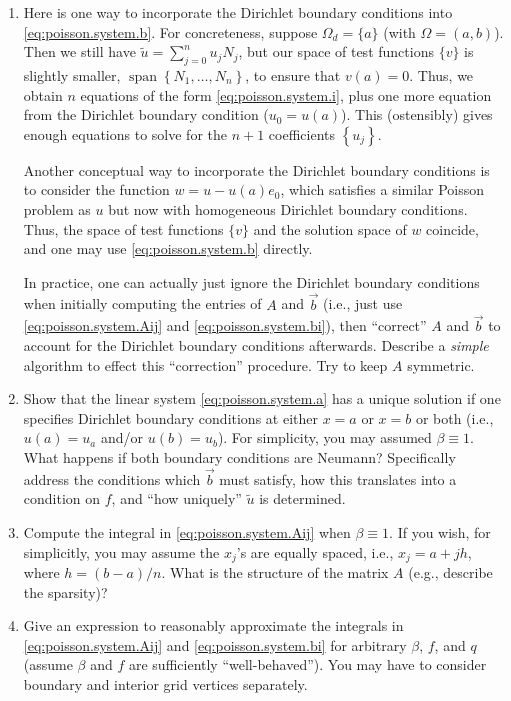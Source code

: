 \begin{enumerate}

\item Here is one way to incorporate the Dirichlet boundary conditions into \eqref{eq:poisson.system.b}. For concreteness, suppose $\Omega_d = \{a\}$ (with $\Omega = (a,b)$). Then we still have $\tilde{u} = \sum_{j = 0}^n u_j N_j$, but our space of test functions $\{v\}$ is slightly smaller, $\operatorname{span} \left\{ N_1, \dotsc, N_n \right\}$, to ensure that $v(a) = 0$. Thus, we obtain $n$ equations of the form \eqref{eq:poisson.system.i}, plus one more equation from the Dirichlet boundary condition ($u_0 = u(a)$). This (ostensibly) gives enough equations to solve for the $n + 1$ coefficients $\left\{ u_j \right\}$.

Another conceptual way to incorporate the Dirichlet boundary conditions is to consider the function $w = u - u(a) e_0$, which satisfies a similar Poisson problem as $u$ but now with homogeneous Dirichlet boundary conditions. Thus, the space of test functions $\{v\}$ and the solution space of $w$ coincide, and one may use \eqref{eq:poisson.system.b} directly.

In practice, one can actually just ignore the Dirichlet boundary conditions when initially computing the entries of $A$ and $\vec{b}$ (i.e., just use \eqref{eq:poisson.system.Aij} and \eqref{eq:poisson.system.bi}), then ``correct'' $A$ and $\vec{b}$ to account for the Dirichlet boundary conditions afterwards. Describe a \emph{simple} algorithm to effect this ``correction'' procedure. Try to keep $A$ symmetric.

\item Show that the linear system \eqref{eq:poisson.system.a} has a unique solution if one specifies Dirichlet boundary conditions at either $x = a$ or $x = b$ or both (i.e., $u(a) = u_a$ and/or $u(b) = u_b$). For simplicity, you may assumed $\beta \equiv 1$. What happens if both boundary conditions are Neumann? Specifically address the conditions which $\vec{b}$ must satisfy, how this translates into a condition on $f$, and ``how uniquely'' $\tilde{u}$ is determined.

\item Compute the integral in \eqref{eq:poisson.system.Aij} when $\beta \equiv 1$. If you wish, for simplicitly, you may assume the $x_j$'s are equally spaced, i.e., $x_j = a + j h$, where $h = (b - a)/n$. What is the structure of the matrix $A$ (e.g., describe the sparsity)?

\item Give an expression to reasonably approximate the integrals in \eqref{eq:poisson.system.Aij} and \eqref{eq:poisson.system.bi} for arbitrary $\beta$, $f$, and $q$ (assume $\beta$ and $f$ are sufficiently ``well-behaved''). You may have to consider boundary and interior grid vertices separately.


\end{enumerate}
